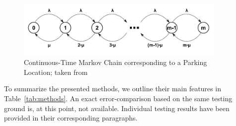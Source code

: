\documentclass{article}
\begin{document}
\begin{figure}[!ht]
    \centering
    \includegraphics[width=4.0in]{markov-chain}
    \caption{Continuous-Time Markov Chain corresponding to a Parking Location; taken from \cite{Caliskan2007}}
    \label{fig:markov-chain}
\end{figure}

To summarize the presented methods, we outline their main features in Table~\ref{tab:methods}. An exact error-comparison based on the same testing ground is, at this point, not available. Individual testing results have been provided in their corresponding paragraphs.
\end{document}
